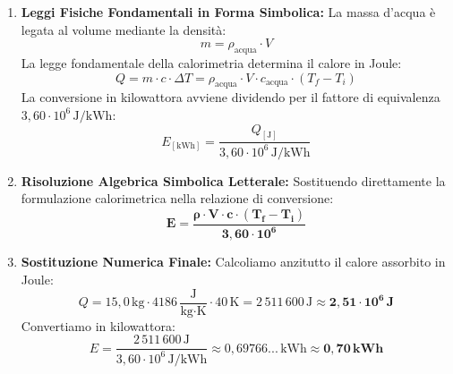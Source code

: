 \documentclass[11pt,a4paper,oneside]{report}
\begin{document}
\begin{problema}
\begin{enumerate}[label=\textbf{Fase \arabic*:}, leftmargin=*, itemsep=5pt]
\begin{center}
  \par{}
  \end{center}

  \item \textbf{Leggi Fisiche Fondamentali in Forma Simbolica:}
  La massa d'acqua \`e legata al volume mediante la densit\`a:
  \[
  m = \rho_{\text{acqua}} \cdot V
  \]
  La legge fondamentale della calorimetria determina il calore in Joule:
  \[
  Q = m \cdot c \cdot \Delta T = \rho_{\text{acqua}} \cdot V \cdot c_{\text{acqua}} \cdot (T_f - T_i)
  \]
  La conversione in kilowattora avviene dividendo per il fattore di equivalenza $3{,}60 \cdot 10^6\,\text{J/kWh}$:
  \[
  E_{[\text{kWh}]} = \frac{Q_{[\text{J}]}}{3{,}60 \cdot 10^6\,\text{J/kWh}}
  \]

  \item \textbf{Risoluzione Algebrica Simbolica Letterale:}
  Sostituendo direttamente la formulazione calorimetrica nella relazione di conversione:
  \[
  \mathbf{E = \frac{\rho \cdot V \cdot c \cdot (T_f - T_i)}{3{,}60 \cdot 10^6}}
  \]

  \item \textbf{Sostituzione Numerica Finale:}
  Calcoliamo anzitutto il calore assorbito in Joule:
  \[
  Q = 15{,}0\,\text{kg} \cdot 4186\,\frac{\text{J}}{\text{kg}\cdot\text{K}} \cdot 40\,\text{K} = 2\,511\,600\,\text{J} \approx \mathbf{2{,}51 \cdot 10^6\,\text{J}}
  \]
  Convertiamo in kilowattora:
  \[
  E = \frac{2\,511\,600\,\text{J}}{3{,}60 \cdot 10^6\,\text{J/kWh}} \approx 0{,}69766...\,\text{kWh} \approx \mathbf{0{,}70\,\text{kWh}}
  \]


\end{enumerate}
\end{problema}
\end{document}
